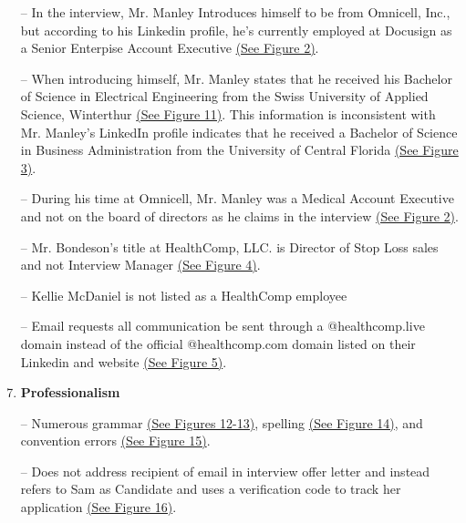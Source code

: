 \begin{fullwidth}
\begin{enumerate}
            \\\medskip
                \item[--] In the interview, Mr. Manley Introduces himself to be from Omnicell, Inc., but according to his Linkedin profile, he's currently employed at Docusign as a Senior Enterpise Account Executive \hyperref[sec:Fig2]{(See Figure 2)}.
            \\\medskip
                \item[--] When introducing himself, Mr. Manley states that he received his Bachelor of Science in Electrical Engineering from the Swiss University of Applied Science, Winterthur \hyperref[sec:Fig11]{(See Figure 11)}. This information is inconsistent with Mr. Manley’s LinkedIn profile indicates that he received a Bachelor of Science in Business Administration from the University of Central Florida \hyperref[sec:Fig3]{(See Figure 3)}.
            \\\medskip 
                \item[--] During his time at Omnicell, Mr. Manley was a Medical Account Executive and not on the board of directors as he claims in the interview \hyperref[sec:Fig2]{(See Figure 2)}. 
            \\\medskip
                \item[--] Mr. Bondeson's title at HealthComp, LLC. is Director of Stop Loss sales and not Interview Manager \hyperref[sec:Fig4]{(See Figure 4)}.
            \\\medskip
                \item[--] Kellie McDaniel is not listed as a HealthComp employee
            \\\medskip
                \item[--] Email requests all communication be sent through a @healthcomp.live domain instead of the official @healthcomp.com domain listed on their Linkedin and website \hyperref[sec:Fig5]{(See Figure 5)}.
    \item  \textbf{Professionalism}
            \\\medskip
                \item[--] Numerous grammar \hyperref[sec:Fig12]{(See Figures 12-13)}, spelling \hyperref[sec:Fig14]{(See Figure 14)}, and convention errors \hyperref[sec:Fig15]{(See Figure 15)}.
            \\\medskip
                \item[--] Does not address recipient of email in interview offer letter and instead refers to Sam as Candidate and uses a verification code to track her application \hyperref[sec:Fig14]{(See Figure 16)}.

\end{enumerate}
\end{fullwidth}
